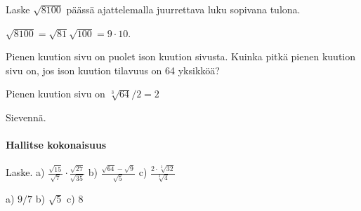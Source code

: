 \begin{tehtavasivu}
\begin{tehtava}
Laske $\sqrt{8100}$ päässä ajattelemalla juurrettava luku sopivana tulona.
\begin{vastaus}
$\sqrt{8100}=\sqrt{81}\sqrt{100}=9\cdot 10$.
\end{vastaus}
\end{tehtava}





\begin{tehtava}
Pienen kuution sivu on puolet ison kuution sivusta. Kuinka pitkä pienen kuution sivu on, jos ison kuution tilavuus on 64 yksikköä? \\
\begin{vastaus}
Pienen kuution sivu on $\sqrt[3]{64}/2=2$ 
\end{vastaus}
\end{tehtava}



\begin{tehtava}
 Sievennä.
	\begin{alakohdat}
	\end{alakohdat}
	  \begin{vastaus}
		\begin{alakohdat}
		 \alakohta{$\sqrt{3}$}
		 \alakohta{$\sqrt[3]{2}$}
		 \alakohta{${\sqrt[60]{42}}^{11}$}
		\end{alakohdat}
	\end{vastaus}
\end{tehtava}



\paragraph*{Hallitse kokonaisuus}



\begin{tehtava} Laske. 
a) $ \frac{\sqrt{15}}{\sqrt{7}} \cdot  \frac{\sqrt{27}}{\sqrt{35}}$  \quad b)  $ \frac{\sqrt{64}-\sqrt{9}}{\sqrt{5}}$   \quad c)  $ \frac{2 \cdot \sqrt[3]{32}}{\sqrt[3]{4}}$ \quad 
\begin{vastaus}
a) $9/7$ \quad b) $\sqrt{5}$ \quad c) $8$ \quad
\end{vastaus}
\end{tehtava}


\end{tehtavasivu}
